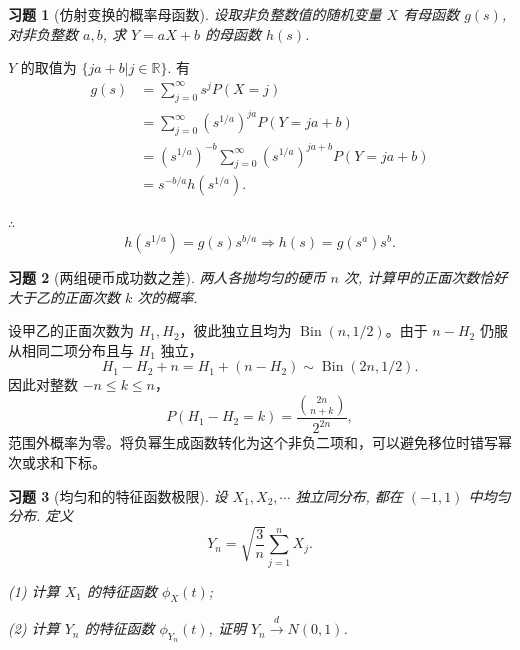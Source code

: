 \documentclass[UTF8,12pt,a4paper,fontset=fandol]{ctexart}
\newtheorem{exercise}{习题}[section]
\begin{document}
\begin{exercise}[仿射变换的概率母函数]\label{q:A6.21}
设取非负整数值的随机变量 $X$ 有母函数 $g(s)$, 对非负整数 $a,b$, 求 $Y=aX+b$ 的母函数 $h(s)$.\par{}
\end{exercise}

\begin{solve}\label{a:A6.21}
    $Y$ 的取值为 $\{ja+b|j\in\mathbb{R}\}$. 有
    \begin{align*}
        g(s) & =\sum\limits_{j=0}^\infty s^jP(X=j) \\
        & =\sum\limits_{j=0}^\infty(s^{1/a})^{ja}P(Y=ja+b) \\
        & =(s^{1/a})^{-b}\sum\limits_{j=0}^\infty(s^{1/a})^{ja+b}P(Y=ja+b) \\
        & =s^{-b/a}h(s^{1/a}).
    \end{align*}

    $\therefore$
    \[h(s^{1/a})=g(s)s^{b/a}\Rightarrow h(s)=g(s^a)s^b.\]
\end{solve}

\begin{exercise}[两组硬币成功数之差]\label{q:A6.24}
两人各抛均匀的硬币 $n$ 次, 计算甲的正面次数恰好大于乙的正面次数 $k$ 次的概率.\par{}
\end{exercise}

\begin{solve}\label{a:A6.24}设甲乙的正面次数为 $H_1,H_2$，彼此独立且均为 $\operatorname{Bin}(n,1/2)$。由于 $n-H_2$ 仍服从相同二项分布且与 $H_1$ 独立，\[H_1-H_2+n=H_1+(n-H_2)\sim\operatorname{Bin}(2n,1/2).\]因此对整数 $-n\le k\le n$，\[P(H_1-H_2=k)=\frac{\binom{2n}{n+k}}{2^{2n}},\]范围外概率为零。将负幂生成函数转化为这个非负二项和，可以避免移位时错写幂次或求和下标。\end{solve}

\begin{exercise}[均匀和的特征函数极限]\label{q:A6.29}
设 $X_1,X_2,\cdots$ 独立同分布, 都在 $(-1,1)$ 中均匀分布. 定义
    \[Y_n=\sqrt{\dfrac{3}{n}}\sum\limits_{j=1}^nX_j.\]

    (1) 计算 $X_1$ 的特征函数 $\phi_X(t)$;

    (2) 计算 $Y_n$ 的特征函数 $\phi_{Y_n}(t)$, 证明 $Y_n\xrightarrow{d}N(0,1)$.\par{}
\end{exercise}
\end{document}
